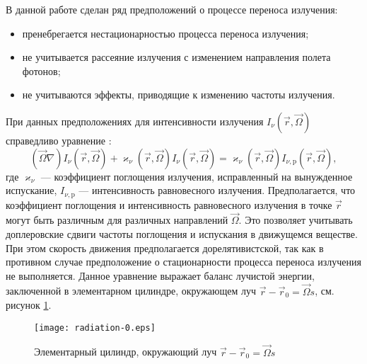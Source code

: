 В данной работе сделан ряд предположений о процессе переноса излучения:
\begin{itemize}
\item пренебрегается нестационарностью процесса переноса излучения;
\item не учитывается рассеяние излучения с изменением направления полета фотонов;
\item не учитываются эффекты, приводящие к изменению частоты излучения.
\end{itemize}
При данных предположениях для интенсивности излучения $I_\nu(\vec r, \vec \Omega)$ справедливо уравнение \cite{zeldovich2008}:
\begin{equation}
(\vec \Omega \nabla) I_\nu(\vec r, \vec \Omega) + \varkappa_\nu(\vec r, \vec \Omega) I_\nu(\vec r, \vec \Omega) = 
\varkappa_\nu(\vec r, \vec \Omega) I_{\nu,\text{p}}(\vec r, \vec \Omega),
\label{eq:transfer}
\end{equation}
где $\varkappa_\nu$ --- коэффициент поглощения излучения, исправленный на вынужденное испускание, $I_{\nu, \text{p}}$ --- интенсивность равновесного излучения. Предполагается, что коэффициент поглощения и интенсивность равновесного излучения в точке $\vec r$ могут быть различным для различных направлений $\vec \Omega$. Это позволяет учитывать доплеровские сдвиги частоты поглощения и испускания в движущемся веществе. При этом скорость движения предполагается дорелятивистской, так как в противном случае предположение о стационарности процесса переноса излучения не выполняется. Данное уравнение выражает баланс лучистой энергии, заключенной в элементарном цилиндре, окружающем луч $\vec r - \vec r_0 = \vec \Omega s$, см. рисунок \ref{fig:cyl}.
\begin{figure}[ht!]
\centering
\texttt{[image: radiation-0.eps]}
\caption{Элементарный цилиндр, окружающий луч $\vec r - \vec r_0 = \vec \Omega s$}
\label{fig:cyl}
\end{figure}

